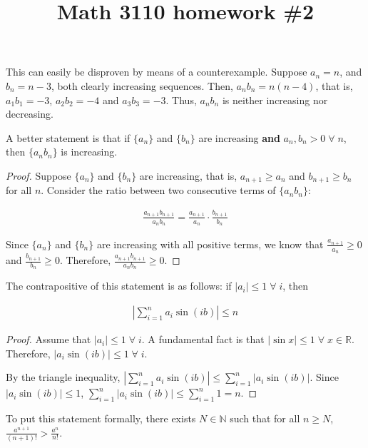 

\title{Math 3110 homework \#2}
\author{\name}
\maketitle

This can easily be disproven by means of a counterexample. Suppose $a_n = n$, and $b_n = n - 3$, both clearly increasing sequences. Then, $a_nb_n = n(n - 4)$, that is, $a_1b_1 = -3$, $a_2b_2 = -4$ and $a_3b_3 = -3$. Thus, $a_nb_n$ is neither increasing nor decreasing.

A better statement is that if $\{a_n\}$ and $\{b_n\}$ are increasing \textbf{and} $a_n, b_n > 0 \;\forall\; n$, then $\{a_nb_n\}$ is increasing.

\begin{proof}
  Suppose $\{a_n\}$ and $\{b_n\}$ are increasing, that is, $a_{n + 1} \geq a_n$ and $b_{n + 1} \geq b_n$ for all $n$. Consider the ratio between two consecutive terms of $\{a_nb_n\}$:

  \begin{align*}
    \frac{a_{n + 1}b_{n + 1}}{a_nb_n} = \frac{a_{n + 1}}{a_n} \cdot \frac{b_{n + 1}}{b_n}
  \end{align*}

  Since $\{a_n\}$ and $\{b_n\}$ are increasing with all positive terms, we know that $\frac{a_{n + 1}}{a_n} \geq 0$ and $\frac{b_{n + 1}}{b_n} \geq 0$. Therefore, $\frac{a_{n + 1}b_{n + 1}}{a_nb_n} \geq 0$.
\end{proof}

The contrapositive of this statement is as follows: if $|a_i| \leq 1 \;\forall\; i$, then

\begin{align*}
  \left|\sum_{i = 1}^n a_i \sin (ib)\right| \leq n
\end{align*}

\begin{proof}
  Assume that $|a_i| \leq 1 \;\forall\; i$. A fundamental fact is that $|\sin x| \leq 1 \;\forall\; x \in \mathbb{R}$. Therefore, $|a_i \sin (ib)| \leq 1 \;\forall\; i$.

  By the triangle inequality, $\left|\sum_{i = 1}^n a_i \sin (ib)\right| \leq \sum_{i = 1}^n |a_i \sin (ib)|$. Since $|a_i \sin (ib)| \leq 1$, $\sum_{i = 1}^n |a_i \sin (ib)| \leq \sum_{i = 1}^n 1 = n$.
\end{proof}

To put this statement formally, there exists $N \in \mathbb{N}$ such that for all $n \geq N$, $\frac{a^{n + 1}}{(n + 1)!} > \frac{a^n}{n!}$.


